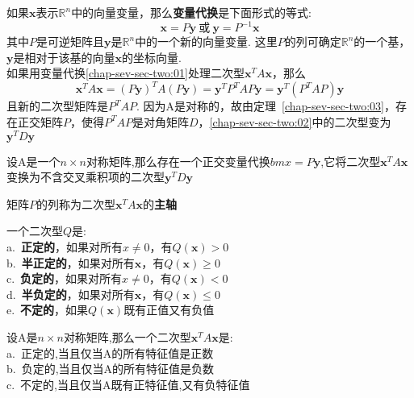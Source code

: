 如果$\bm{x}$表示$\mathbb{R}^n$中的向量变量，那么\textbf{变量代换}是下面形式的等式:
\begin{equation}
\bm{x}=P\bm{y}\ \text{或}\ \bm{y}=P^{-1}\bm{x}\label{chap-sev-sec-two:01}
\end{equation}
其中$P$是可逆矩阵且$\bm{y}$是$\mathbb{R}^n$中的一个新的向量变量. 这里$P$的列可确定$\mathbb{R}^n$的一个基，$\bm{y}$是相对于该基的向量$\bm{x}$的坐标向量.\\
如果用变量代换\eqref{chap-sev-sec-two:01}处理二次型$\bm{x}^TA\bm{x}$，那么
\begin{equation}
\bm{x}^TA\bm{x}=(P\bm{y})^TA(P\bm{y})=\bm{y}^TP^TAP\bm{y}=\bm{y}^T(P^TAP)\bm{y}\label{chap-sev-sec-two:02}
\end{equation}
且新的二次型矩阵是$P^TAP$. 因为A是对称的，故由定理\ \ref{chap-sev-sec-two:03}，存在正交矩阵$P$，使得$P^TAP$是对角矩阵$D$，\eqref{chap-sev-sec-two:02}中的二次型变为$\bm{y}^TD\bm{y}$\\[2ex]

\begin{TheoremTwo}[主轴定理]
设A是一个$n\times n$对称矩阵,那么存在一个正交变量代换$bm{x}=P\bm{y}$,它将二次型$\bm{x}^TA\bm{x}$变换为不含交叉乘积项的二次型$\bm{y}^TD\bm{y}$
\end{TheoremTwo}\vspace{4ex}

矩阵$P$的列称为二次型$\bm{x}^TA\bm{x}$的\textbf{主轴}\\[2ex]

\begin{definition}
一个二次型$Q$是:\\
a.\ \textbf{正定的}，如果对所有$x\neq 0$，有$Q(\bm{x})>0$\\
b.\ \textbf{半正定的}，如果对所有$\bm{x}$，有$Q(\bm{x})\geqslant 0$\\
c.\ \textbf{负定的}，如果对所有$x\neq 0$，有$Q(\bm{x})<0$\\
d.\ \textbf{半负定的}，如果对所有$\bm{x}$，有$Q(\bm{x})\leqslant 0$\\
e.\ \textbf{不定的}，如果$Q(\bm{x})$既有正值又有负值
\end{definition}\vspace{4ex}

\begin{TheoremTwo}[二次型与特征值]
设A是$n\times n$对称矩阵,那么一个二次型$\bm{x}^TA\bm{x}$是:\\
a.\ 正定的,当且仅当A的所有特征值是正数\\
b.\ 负定的,当且仅当A的所有特征值是负数\\
c.\ 不定的,当且仅当A既有正特征值,又有负特征值
\end{TheoremTwo}
